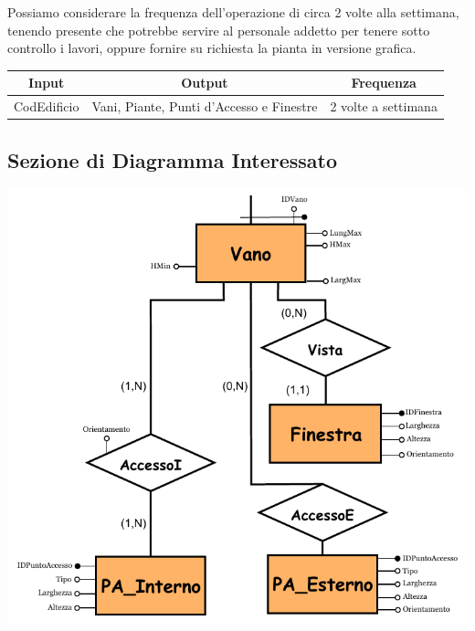 \documentclass[12pt,a4paper]{report}
\begin{document}
        Possiamo considerare la frequenza dell'operazione di circa 2 volte alla settimana, tenendo presente che potrebbe servire al personale addetto per tenere sotto controllo i lavori, oppure fornire su richiesta la pianta in versione grafica.
        
        \begin{center}
            \begin{tabular}{|c|c|c|}
                \hline
                \rowcolor{viola} \textbf{Input} & \textbf{Output} & \textbf{Frequenza} \\ \hline
                CodEdificio & Vani, Piante, Punti d'Accesso e Finestre & 2 volte a settimana \\ \hline
            \end{tabular}
        \end{center}
        
        \subsection{Sezione di Diagramma Interessato}
        \begin{center}
            \includegraphics[scale=1.45]{sezione_operazione2.pdf}
        \end{center}
        
\end{document}
